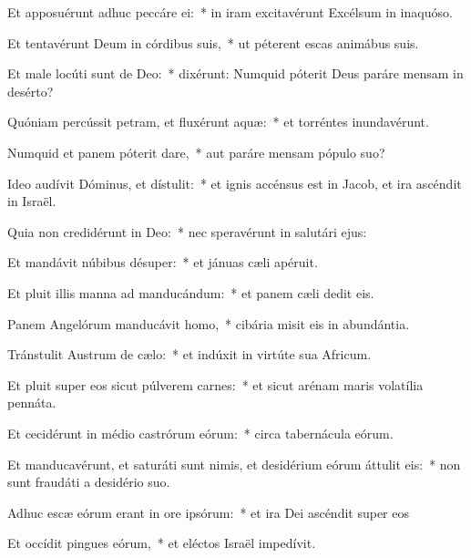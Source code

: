 
\item Et apposuérunt adhuc peccáre ei:~* in iram excitavérunt Excélsum in inaquóso.

\item Et tentavérunt Deum in córdibus suis,~* ut péterent escas animábus suis.

\item Et male locúti sunt de Deo:~* dixérunt: Numquid póterit Deus paráre mensam in desérto?

\item Quóniam percússit petram, et fluxérunt aquæ:~* et torréntes inundavérunt.

\item Numquid et panem póterit dare,~* aut paráre mensam pópulo suo?

\item Ideo audívit Dóminus, et dístulit:~* et ignis accénsus est in Jacob, et ira ascéndit in Israël.

\item Quia non credidérunt in Deo:~* nec speravérunt in salutári ejus:

\item Et mandávit núbibus désuper:~* et jánuas cæli apéruit.

\item Et pluit illis manna ad manducándum:~* et panem cæli dedit eis.

\item Panem Angelórum manducávit homo,~* cibária misit eis in abundántia.

\item Tránstulit Austrum de cælo:~* et indúxit in virtúte sua Africum.

\item Et pluit super eos sicut púlverem carnes:~* et sicut arénam maris volatília pennáta.

\item Et cecidérunt in médio castrórum eórum:~* circa tabernácula eórum.

\item Et manducavérunt, et saturáti sunt nimis, et desidérium eórum áttulit eis:~* non sunt fraudáti a desidério suo.

\item Adhuc escæ eórum erant in ore ipsórum:~* et ira Dei ascéndit super eos

\item Et occídit pingues eórum,~* et eléctos Israël impedívit.
